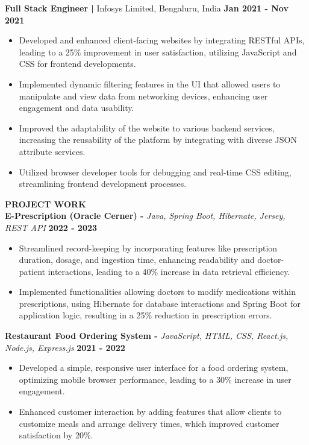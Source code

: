 \documentclass{article}
\begin{document}
\noindent \textbf{Full Stack Engineer | } Infosys Limited, Bengaluru, India  \hfill \textbf{Jan 2021 - Nov 2021}
\begin{itemize}[noitemsep,nolistsep,leftmargin=*]
\item {\small Developed and enhanced client-facing websites by integrating RESTful APIs, leading to a 25\% improvement in user satisfaction, utilizing JavaScript and CSS for frontend developments.}
\item {\small Implemented dynamic filtering features in the UI that allowed users to manipulate and view data from networking devices, enhancing user engagement and data usability.}
\item {\small Improved the adaptability of the website to various backend services, increasing the reusability of the platform by integrating with diverse JSON attribute services.}
\item {\small Utilized browser developer tools for debugging and real-time CSS editing, streamlining frontend development processes.}\\
\end{itemize}



\noindent \textbf{PROJECT WORK} \\
\noindent \textbf{E-Prescription (Oracle Cerner) -} \textit{Java, Spring Boot, Hibernate, Jersey, REST API} \hfill \textbf{2022 - 2023}
\begin{itemize}[noitemsep,nolistsep,leftmargin=*]
\item {\small Streamlined record-keeping by incorporating features like prescription duration, dosage, and ingestion time, enhancing readability and doctor-patient interactions, leading to a 40\% increase in data retrieval efficiency.}
\item {\small Implemented functionalities allowing doctors to modify medications within prescriptions, using Hibernate for database interactions and Spring Boot for application logic, resulting in a 25\% reduction in prescription errors.}
\end{itemize}

\noindent \textbf{Restaurant Food Ordering System -} \textit{JavaScript, HTML, CSS, React.js, Node.js, Express.js} \hfill \textbf{2021 - 2022}
\begin{itemize}[noitemsep,nolistsep,leftmargin=*]
\item {\small Developed a simple, responsive user interface for a food ordering system, optimizing mobile browser performance, leading to a 30\% increase in user engagement.}
\item {\small Enhanced customer interaction by adding features that allow clients to customize meals and arrange delivery times, which improved customer satisfaction by 20\%.}
\end{itemize}
\end{document}
